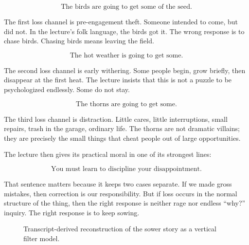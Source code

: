 \begin{equation}
\text{The birds are going to get some of the seed.}
\end{equation}

The first loss channel is pre-engagement theft. Someone intended to come, but did not. In the lecture's folk language, the birds got it. The wrong response is to chase birds. Chasing birds means leaving the field.

\begin{equation}
\text{The hot weather is going to get some.}
\end{equation}

The second loss channel is early withering. Some people begin, grow briefly, then disappear at the first heat. The lecture insists that this is not a puzzle to be psychologized endlessly. Some do not stay.

\begin{equation}
\text{The thorns are going to get some.}
\end{equation}

The third loss channel is distraction. Little cares, little interruptions, small repairs, trash in the garage, ordinary life. The thorns are not dramatic villains; they are precisely the small things that cheat people out of large opportunities.

The lecture then gives its practical moral in one of its strongest lines:

\begin{equation}
\text{You must learn to discipline your disappointment.}
\end{equation}

That sentence matters because it keeps two cases separate. If we made gross mistakes, then correction is our responsibility. But if loss occurs in the normal structure of the thing, then the right response is neither rage nor endless ``why?'' inquiry. The right response is to keep sowing.

\begin{figure}[h]
\centering
{}
\caption{Transcript-derived reconstruction of the sower story as a vertical filter model.}
\end{figure}

